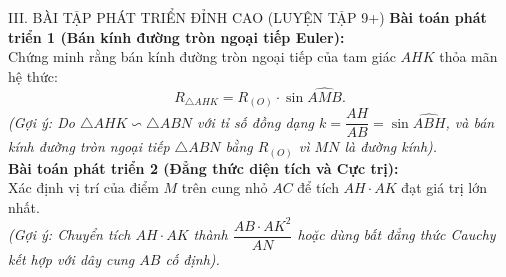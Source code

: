 \documentclass[11pt,a4paper]{article}
\begin{document}
\vspace{1mm}

\begin{exercisebox}{III. BÀI TẬP PHÁT TRIỂN ĐỈNH CAO (LUYỆN TẬP 9+)}
\textbf{Bài toán phát triển 1 (Bán kính đường tròn ngoại tiếp Euler):}\\
Chứng minh rằng bán kính đường tròn ngoại tiếp của tam giác $AHK$ thỏa mãn hệ thức:
\[
R_{\triangle AHK} = R_{(O)} \cdot \sin \widehat{AMB}.
\]
\textit{(Gợi ý: Do $\triangle AHK \backsim \triangle ABN$ với tỉ số đồng dạng $k = \dfrac{AH}{AB} = \sin \widehat{ABH}$, và bán kính đường tròn ngoại tiếp $\triangle ABN$ bằng $R_{(O)}$ vì $MN$ là đường kính).}\\[2mm]
\textbf{Bài toán phát triển 2 (Đẳng thức diện tích và Cực trị):}\\
Xác định vị trí của điểm $M$ trên cung nhỏ $AC$ để tích $AH \cdot AK$ đạt giá trị lớn nhất.\\[1mm]
\textit{(Gợi ý: Chuyển tích $AH \cdot AK$ thành $\dfrac{AB \cdot AK^2}{AN}$ hoặc dùng bất đẳng thức Cauchy kết hợp với dây cung $AB$ cố định).}
\end{exercisebox}
\end{document}

